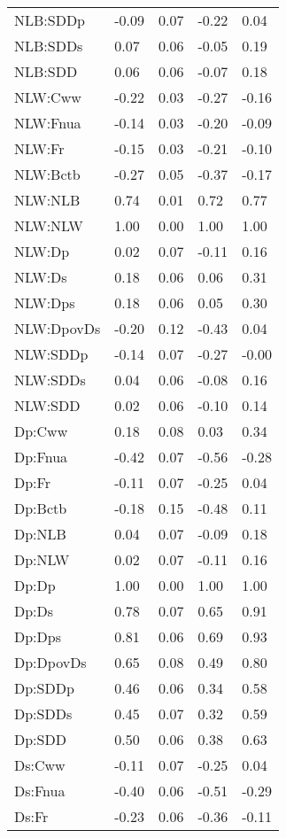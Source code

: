 \begin{center}
\begin{longtable}{|p{0.9in}|p{0.7in}|p{0.7in}|p{0.7in}|p{0.7in}|}
  NLB:SDDp & -0.09 & 0.07 & -0.22 & 0.04 \\ 
  NLB:SDDs & 0.07 & 0.06 & -0.05 & 0.19 \\ 
  NLB:SDD & 0.06 & 0.06 & -0.07 & 0.18 \\ 
  NLW:Cww & -0.22 & 0.03 & -0.27 & -0.16 \\ 
  NLW:Fnua & -0.14 & 0.03 & -0.20 & -0.09 \\ 
  NLW:Fr & -0.15 & 0.03 & -0.21 & -0.10 \\ 
  NLW:Bctb & -0.27 & 0.05 & -0.37 & -0.17 \\ 
  NLW:NLB & 0.74 & 0.01 & 0.72 & 0.77 \\ 
  NLW:NLW & 1.00 & 0.00 & 1.00 & 1.00 \\ 
  NLW:Dp & 0.02 & 0.07 & -0.11 & 0.16 \\ 
  NLW:Ds & 0.18 & 0.06 & 0.06 & 0.31 \\ 
  NLW:Dps & 0.18 & 0.06 & 0.05 & 0.30 \\ 
  NLW:DpovDs & -0.20 & 0.12 & -0.43 & 0.04 \\ 
  NLW:SDDp & -0.14 & 0.07 & -0.27 & -0.00 \\ 
  NLW:SDDs & 0.04 & 0.06 & -0.08 & 0.16 \\ 
  NLW:SDD & 0.02 & 0.06 & -0.10 & 0.14 \\ 
  Dp:Cww & 0.18 & 0.08 & 0.03 & 0.34 \\ 
  Dp:Fnua & -0.42 & 0.07 & -0.56 & -0.28 \\ 
  Dp:Fr & -0.11 & 0.07 & -0.25 & 0.04 \\ 
  Dp:Bctb & -0.18 & 0.15 & -0.48 & 0.11 \\ 
  Dp:NLB & 0.04 & 0.07 & -0.09 & 0.18 \\ 
  Dp:NLW & 0.02 & 0.07 & -0.11 & 0.16 \\ 
  Dp:Dp & 1.00 & 0.00 & 1.00 & 1.00 \\ 
  Dp:Ds & 0.78 & 0.07 & 0.65 & 0.91 \\ 
  Dp:Dps & 0.81 & 0.06 & 0.69 & 0.93 \\ 
  Dp:DpovDs & 0.65 & 0.08 & 0.49 & 0.80 \\ 
  Dp:SDDp & 0.46 & 0.06 & 0.34 & 0.58 \\ 
  Dp:SDDs & 0.45 & 0.07 & 0.32 & 0.59 \\ 
  Dp:SDD & 0.50 & 0.06 & 0.38 & 0.63 \\ 
  Ds:Cww & -0.11 & 0.07 & -0.25 & 0.04 \\ 
  Ds:Fnua & -0.40 & 0.06 & -0.51 & -0.29 \\ 
  Ds:Fr & -0.23 & 0.06 & -0.36 & -0.11 \\ 

\end{longtable}
\end{center}
